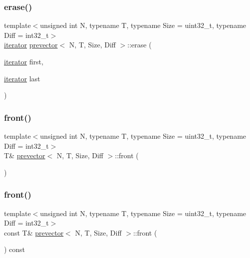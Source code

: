 \subsubsection{\texorpdfstring{erase()}{erase()}\hspace{0.1cm}{\footnotesize\ttfamily [2/2]}}
{\footnotesize\ttfamily template$<$unsigned int N, typename T, typename Size = uint32\+\_\+t, typename Diff = int32\+\_\+t$>$ \\
\mbox{\hyperlink{classprevector_1_1iterator}{iterator}} \mbox{\hyperlink{classprevector}{prevector}}$<$ N, T, Size, Diff $>$\+::erase (\begin{DoxyParamCaption}\item[{\mbox{\hyperlink{classprevector_1_1iterator}{iterator}}}]{first,  }\item[{\mbox{\hyperlink{classprevector_1_1iterator}{iterator}}}]{last }\end{DoxyParamCaption})\hspace{0.3cm}{\ttfamily [inline]}}

\mbox{\label{classprevector_acb71926f63896b2bd6f4da4ffe515d19}} 
\subsubsection{\texorpdfstring{front()}{front()}\hspace{0.1cm}{\footnotesize\ttfamily [1/2]}}
{\footnotesize\ttfamily template$<$unsigned int N, typename T, typename Size = uint32\+\_\+t, typename Diff = int32\+\_\+t$>$ \\
T\& \mbox{\hyperlink{classprevector}{prevector}}$<$ N, T, Size, Diff $>$\+::front (\begin{DoxyParamCaption}{ }\end{DoxyParamCaption})\hspace{0.3cm}{\ttfamily [inline]}}

\mbox{\label{classprevector_a6c970d084ff59fcfb81185456acb4bb6}} 
\subsubsection{\texorpdfstring{front()}{front()}\hspace{0.1cm}{\footnotesize\ttfamily [2/2]}}
{\footnotesize\ttfamily template$<$unsigned int N, typename T, typename Size = uint32\+\_\+t, typename Diff = int32\+\_\+t$>$ \\
const T\& \mbox{\hyperlink{classprevector}{prevector}}$<$ N, T, Size, Diff $>$\+::front (\begin{DoxyParamCaption}{ }\end{DoxyParamCaption}) const\hspace{0.3cm}{\ttfamily [inline]}}

